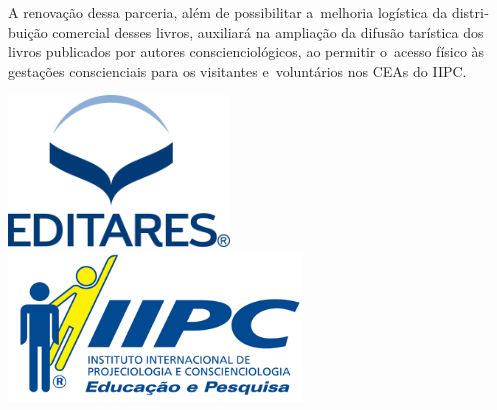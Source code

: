 \documentclass{gescons}
\begin{document}
A renovação dessa parceria, além de possibilitar a~melhoria logística da distri­buição comercial desses livros, auxiliará na ampliação da difusão tarística dos livros pu­blicados por autores conscienciológicos, ao permitir o~acesso físico às gestações conscien­ciais para os visitantes e~voluntários nos CEAs do IIPC.

\vspace{5mm}

\begin{center}
    \includegraphics[height=4cm]{images/Logo-Editares-com-Marca-Registrada.png}
    \hspace{3cm}
    \includegraphics[height=4cm]{images/IIPC_logo.png} 
\end{center}











\end{document}
